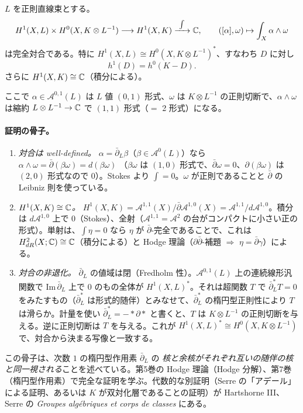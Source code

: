 \begin{thm}[Serre 双対]\label{thm:serre}
$L$ を正則直線束とする。
\[
H^1(X,L)\times H^0(X,K\otimes L^{-1})\longrightarrow H^1(X,K)\xrightarrow{\ \int\ }\mathbb C,
\qquad([\alpha],\omega)\mapsto\int_X\alpha\wedge\omega
\]
は完全対合である。特に $H^1(X,L)\cong H^0(X,K\otimes L^{-1})^*$、すなわち $D$ に対し
\[
h^1(D)=h^0(K-D).
\]
さらに $H^1(X,K)\cong\mathbb C$（積分による）。
\end{thm}
ここで $\alpha\in\mathcal A^{0,1}(L)$ は $L$ 値 $(0,1)$ 形式、$\omega$ は $K\otimes L^{-1}$ の正則切断で、$\alpha\wedge\omega$ は縮約 $L\otimes L^{-1}\to\mathbb C$ で $(1,1)$ 形式（$=$ 2 形式）になる。

\paragraph{証明の骨子。}
\begin{enumerate}
\item \emph{対合は well-defined。} $\alpha=\bar\partial_L\beta$（$\beta\in\mathcal A^0(L)$）なら $\alpha\wedge\omega=\bar\partial(\beta\omega)=d(\beta\omega)$ （$\beta\omega$ は $(1,0)$ 形式で、$\bar\partial\omega=0$、$\partial(\beta\omega)$ は $(2,0)$ 形式なので $0$）。Stokes より $\int=0$。$\omega$ が正則であることと $\bar\partial$ の Leibniz 則を使っている。
\item \emph{$H^1(X,K)\cong\mathbb C$。} $H^1(X,K)=\mathcal A^{1,1}(X)/\bar\partial\mathcal A^{1,0}(X)=\mathcal A^{1,1}/d\mathcal A^{1,0}$。積分は $d\mathcal A^{1,0}$ 上で $0$（Stokes）、全射（$\mathcal A^{1,1}=\mathcal A^2$ の台がコンパクトに小さい正の形式）。単射は、$\int\eta=0$ なら $\eta$ が $\bar\partial$-完全であることで、これは $H^2_{dR}(X;\mathbb C)\cong\mathbb C$（積分による）と Hodge 理論（$\partial\bar\partial$-補題 $\Rightarrow$ $\eta=\bar\partial\gamma$）による。
\item \emph{対合の非退化。} $\bar\partial_L$ の値域は閉（Fredholm 性）。$\mathcal A^{0,1}(L)$ 上の連続線形汎関数で $\mathrm{Im}\,\bar\partial_L$ 上で $0$ のもの全体が $H^1(X,L)^*$。それは超関数 $T$ で $\bar\partial_L^*T=0$ をみたすもの（$\bar\partial_L^*$ は形式的随伴）とみなせて、$\bar\partial_L^*$ の楕円型正則性により $T$ は滑らか。計量を使い $\bar\partial_L^*=-*\partial *$ と書くと、$T$ は $K\otimes L^{-1}$ の正則切断を与える。逆に正則切断は $T$ を与える。これが $H^1(X,L)^*\cong H^0(X,K\otimes L^{-1})$ で、対合から決まる写像と一致する。
\end{enumerate}
この骨子は、次数 $1$ の楕円型作用素 $\bar\partial_L$ の \emph{核と余核がそれぞれ互いの随伴の核と同一視される}ことを述べている。第5巻の Hodge 理論（Hodge 分解）、第7巻（楕円型作用素）で完全な証明を学ぶ。代数的な別証明（Serre の「アデール」による証明、あるいは $K$ が双対化層であることの証明）が Hartshorne III、Serre の \emph{Groupes algébriques et corps de classes} にある。

